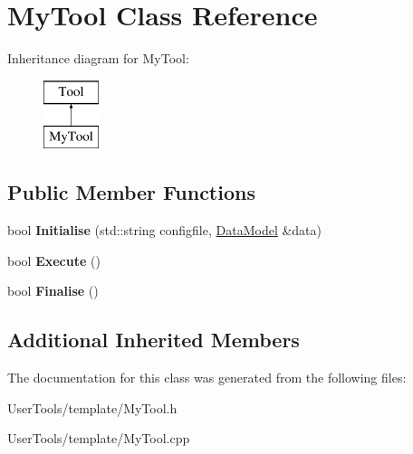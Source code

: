 \hypertarget{classMyTool}{\section{My\-Tool Class Reference}
\label{classMyTool}
}
Inheritance diagram for My\-Tool\-:\begin{figure}[H]
\begin{center}
\leavevmode
\includegraphics[height=2.000000cm]{classMyTool}
\end{center}
\end{figure}
\subsection*{Public Member Functions}
\begin{DoxyCompactItemize}
\item 
\hypertarget{classMyTool_a3bf60061195a18542c4cfb2916b9dad9}{bool {\bfseries Initialise} (std\-::string configfile, \hyperlink{classDataModel}{Data\-Model} \&data)}\label{classMyTool_a3bf60061195a18542c4cfb2916b9dad9}

\item 
\hypertarget{classMyTool_a0a58122023af90b9200d0e71e89cfb36}{bool {\bfseries Execute} ()}\label{classMyTool_a0a58122023af90b9200d0e71e89cfb36}

\item 
\hypertarget{classMyTool_a060ec6356451aa335d0de41093c9992f}{bool {\bfseries Finalise} ()}\label{classMyTool_a060ec6356451aa335d0de41093c9992f}

\end{DoxyCompactItemize}
\subsection*{Additional Inherited Members}


The documentation for this class was generated from the following files\-:\begin{DoxyCompactItemize}
\item 
User\-Tools/template/My\-Tool.\-h\item 
User\-Tools/template/My\-Tool.\-cpp\end{DoxyCompactItemize}
